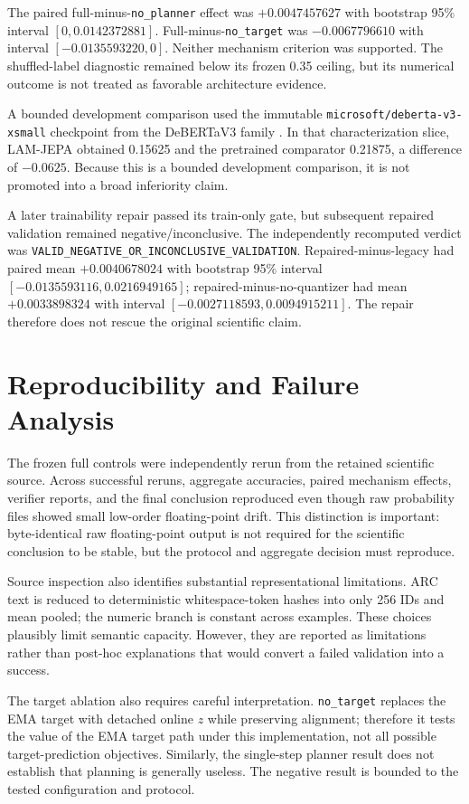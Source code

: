 \documentclass[conference]{IEEEtran}
\begin{document}
The paired full-minus-\texttt{no\_planner} effect was $+0.0047457627$ with bootstrap 95\% interval $[0,0.0142372881]$. Full-minus-\texttt{no\_target} was $-0.0067796610$ with interval $[-0.0135593220,0]$. Neither mechanism criterion was supported. The shuffled-label diagnostic remained below its frozen 0.35 ceiling, but its numerical outcome is not treated as favorable architecture evidence.

A bounded development comparison used the immutable \texttt{microsoft/deberta-v3-xsmall} checkpoint from the DeBERTaV3 family \cite{debertav3}. In that characterization slice, LAM-JEPA obtained 0.15625 and the pretrained comparator 0.21875, a difference of $-0.0625$. Because this is a bounded development comparison, it is not promoted into a broad inferiority claim.

A later trainability repair passed its train-only gate, but subsequent repaired validation remained negative/inconclusive. The independently recomputed verdict was \texttt{VALID\_NEGATIVE\_OR\_INCONCLUSIVE\_VALIDATION}. Repaired-minus-legacy had paired mean $+0.0040678024$ with bootstrap 95\% interval $[-0.0135593116,0.0216949165]$; repaired-minus-no-quantizer had mean $+0.0033898324$ with interval $[-0.0027118593,0.0094915211]$. The repair therefore does not rescue the original scientific claim.

\section{Reproducibility and Failure Analysis}
The frozen full controls were independently rerun from the retained scientific source. Across successful reruns, aggregate accuracies, paired mechanism effects, verifier reports, and the final conclusion reproduced even though raw probability files showed small low-order floating-point drift. This distinction is important: byte-identical raw floating-point output is not required for the scientific conclusion to be stable, but the protocol and aggregate decision must reproduce.

Source inspection also identifies substantial representational limitations. ARC text is reduced to deterministic whitespace-token hashes into only 256 IDs and mean pooled; the numeric branch is constant across examples. These choices plausibly limit semantic capacity. However, they are reported as limitations rather than post-hoc explanations that would convert a failed validation into a success.

The target ablation also requires careful interpretation. \texttt{no\_target} replaces the EMA target with detached online $z$ while preserving alignment; therefore it tests the value of the EMA target path under this implementation, not all possible target-prediction objectives. Similarly, the single-step planner result does not establish that planning is generally useless. The negative result is bounded to the tested configuration and protocol.
\end{document}
